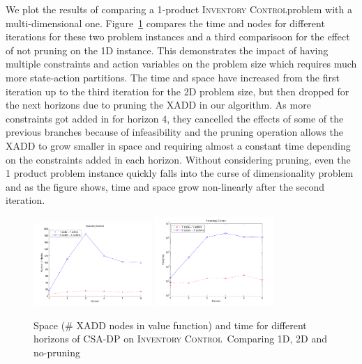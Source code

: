 \documentclass[letterpaper]{article}
\newcommand{\InventoryControl}{\textsc{Inventory Control}}
\begin{document}
We plot the results of comparing a 1-product \InventoryControl problem with a multi-dimensional one. Figure~\ref{fig:invC} compares the time and nodes for different iterations for these two problem instances and a third comparisoon for the effect of not pruning on the 1D instance. This demonstrates the impact of having multiple constraints and action variables on the problem size which requires much more state-action partitions. The time and space have increased from the first iteration up to the third iteration for the 2D problem size, but then dropped for the next horizons due to pruning the XADD in our algorithm. As more constraints got added in for horizon 4, they cancelled the effects of some of the previous branches because of infeasibility and the pruning operation allows the XADD to grow smaller in space and requiring almost a constant time depending on the constraints added in each horizon. Without considering pruning, even the 1 product problem instance quickly falls into the curse of dimensionality problem and as the figure shows, time and space grow non-linearly after the second iteration. 
\begin{figure}[t]
\centering
\includegraphics[width=0.4\textwidth]{Figures1/space1-2.pdf}
\hspace{5mm}
\includegraphics[width=0.4\textwidth]{Figures1/time1-2.pdf}
\caption{%
Space (\# XADD nodes in value function) and
time for different horizons of CSA-DP on \InventoryControl\ 
Comparing 1D, 2D and no-pruning}
\label{fig:invC}
\end{figure}
\end{document}
